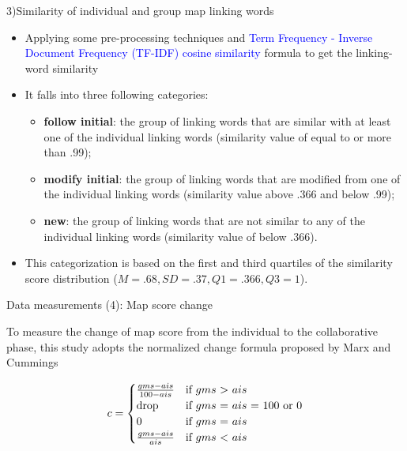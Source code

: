 \begin{frame}{3)Similarity of individual and group map linking words}

\begin{itemize}
    \item Applying some pre-processing techniques and \textcolor{blue}{Term Frequency - Inverse Document Frequency (TF-IDF) cosine similarity} formula to get the linking-word similarity
    \item It falls into three following categories: 
    {\small \begin{itemize}
        \item \textbf{follow initial}: the group of linking words that are similar with at least one of the individual linking words (similarity value of equal to or more than .99);
        \item \textbf{modify initial}: the group of linking words that are modified from one of the individual linking words (similarity value above .366 and below .99);
        \item \textbf{new}: the group of linking words that are not similar to any of the individual linking words (similarity value of below .366).
    \end{itemize}} 
    \item This categorization is based on the first and third quartiles 
    of the similarity score distribution ($M = .68, SD = .37, Q1 = .366, Q3 = 1$).
\end{itemize}

\end{frame}

\begin{frame}{Data measurements (4): Map score change}

To measure the change of map score from the individual to the collaborative phase, this 
study adopts the normalized change formula proposed by Marx and Cummings 


\begin{equation}
 c =
    \begin{cases}
        \frac{gms - ais}{100 - ais} & \text{if $gms$ > $ais$}\\
        $drop$ & \text{if $gms$ = $ais$ = 100 or 0} \\
        0 & \text{if $gms$ = $ais$}\\
        \frac{gms - ais}{ais} & \text{if $gms$ < $ais$}
    \end{cases}
    \label{eq:7}
\end{equation}
    
\end{frame}


